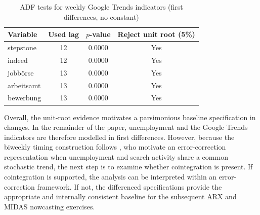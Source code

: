 \documentclass[12pt,a4paper]{article}
\begin{document}
\begin{table}[ht]
\centering
\caption{ADF tests for weekly Google Trends indicators (first differences, no constant)}
\label{tab:adf_weekly}
\begin{tabular}{lccc}
\toprule
Variable & Used lag & $p$-value & Reject unit root (5\%) \\
\midrule
stepstone  & 12 & 0.0000 & Yes \\
indeed     & 12 & 0.0000 & Yes \\
jobbörse   & 13 & 0.0000 & Yes \\
arbeitsamt & 13 & 0.0000 & Yes \\
bewerbung  & 13 & 0.0000 & Yes \\
\bottomrule
\end{tabular}
\end{table}
Overall, the unit-root evidence motivates a parsimonious baseline specification in changes. In the remainder of the paper, unemployment and the Google Trends indicators are therefore modelled in first differences. However, because the biweekly timing construction follows \citet{Askitas}, who motivate an error-correction representation when unemployment and search activity share a common stochastic trend, the next step is to examine whether cointegration is present. If cointegration is supported, the analysis can be interpreted within an error-correction framework. If not, the differenced specifications provide the appropriate and internally consistent baseline for the subsequent ARX and MIDAS nowcasting exercises.
\end{document}
